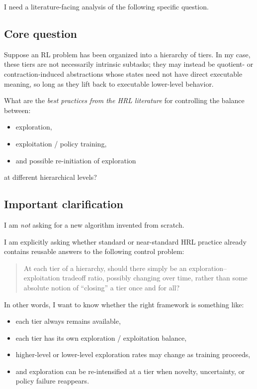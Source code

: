 \documentclass[11pt]{article}
\begin{document}
I need a literature-facing analysis of the following specific question.

\subsection*{Core question}

Suppose an RL problem has been organized into a hierarchy of tiers. In my case, these tiers are not necessarily intrinsic subtasks; they may instead be quotient- or contraction-induced abstractions whose states need not have direct executable meaning, so long as they lift back to executable lower-level behavior.

What are the \emph{best practices from the HRL literature} for controlling the balance between:

\begin{itemize}
\item exploration,
\item exploitation / policy training,
\item and possible re-initiation of exploration
\end{itemize}

at different hierarchical levels?

\subsection*{Important clarification}

I am \emph{not} asking for a new algorithm invented from scratch.

I am explicitly asking whether standard or near-standard HRL practice already contains reusable answers to the following control problem:

\begin{quote}
At each tier of a hierarchy, should there simply be an exploration--exploitation tradeoff ratio, possibly changing over time, rather than some absolute notion of ``closing'' a tier once and for all?
\end{quote}

In other words, I want to know whether the right framework is something like:

\begin{itemize}
\item each tier always remains available,
\item each tier has its own exploration / exploitation balance,
\item higher-level or lower-level exploration rates may change as training proceeds,
\item and exploration can be re-intensified at a tier when novelty, uncertainty, or policy failure reappears.
\end{itemize}
\end{document}
